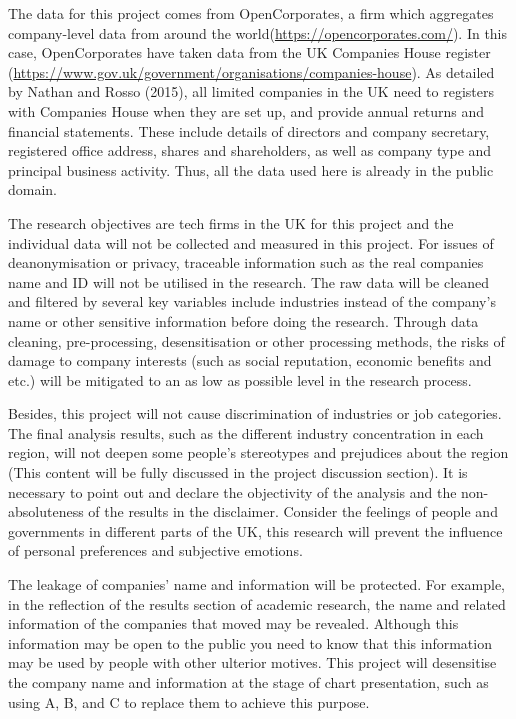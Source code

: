 \documentclass[
  12pt,
  oneside]{book}
\begin{document}
The data for this project comes from OpenCorporates, a firm which aggregates company-level data from around the world(\url{https://opencorporates.com/}). In this case, OpenCorporates have taken data from the UK Companies House register (\url{https://www.gov.uk/government/organisations/companies-house}). As detailed by Nathan and Rosso (2015), all limited companies in the UK need to registers with Companies House when they are set up, and provide annual returns and financial statements. These include details of directors and company secretary, registered office address, shares and shareholders, as well as company type and principal business activity. Thus, all the data used here is already in the public domain.

The research objectives are tech firms in the UK for this project and the individual data will not be collected and measured in this project. For issues of deanonymisation or privacy, traceable information such as the real companies name and ID will not be utilised in the research. The raw data will be cleaned and filtered by several key variables include industries instead of the company's name or other sensitive information before doing the research. Through data cleaning, pre-processing, desensitisation or other processing methods, the risks of damage to company interests (such as social reputation, economic benefits and etc.) will be mitigated to an as low as possible level in the research process.

Besides, this project will not cause discrimination of industries or job categories. The final analysis results, such as the different industry concentration in each region, will not deepen some people's stereotypes and prejudices about the region (This content will be fully discussed in the project discussion section). It is necessary to point out and declare the objectivity of the analysis and the non-absoluteness of the results in the disclaimer. Consider the feelings of people and governments in different parts of the UK, this research will prevent the influence of personal preferences and subjective emotions.

The leakage of companies' name and information will be protected. For example, in the reflection of the results section of academic research, the name and related information of the companies that moved may be revealed. Although this information may be open to the public you need to know that this information may be used by people with other ulterior motives. This project will desensitise the company name and information at the stage of chart presentation, such as using A, B, and C to replace them to achieve this purpose.
\end{document}
